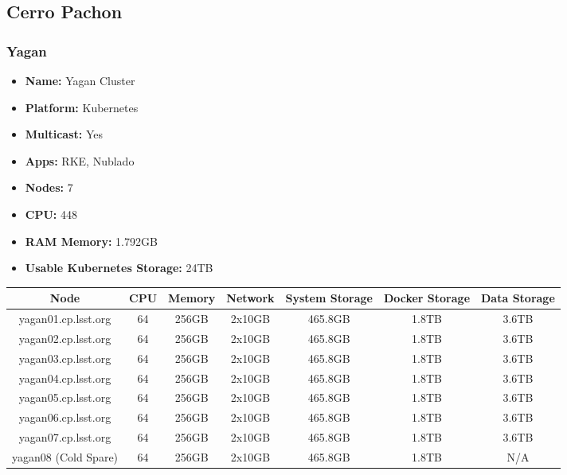 \newpage
\subsection{Cerro Pachon}
\subsubsection{Yagan}
\begin{itemize}
  \itemsep0em 
  \item \textbf{Name:}       Yagan Cluster
  \item \textbf{Platform:}   Kubernetes
  \item \textbf{Multicast:}  Yes
  \item \textbf{Apps:}       RKE, Nublado
  \item \textbf{Nodes:}      7
  \item \textbf{CPU:}        448
  \item \textbf{RAM Memory:} 1.792GB
  \item \textbf{Usable Kubernetes Storage:} 24TB
\end{itemize}
\begin{center}
  \small
  \begin{tabular}{||c c c c c c c||} 
    \hline
    \textbf{Node} & \textbf{CPU} & \textbf{Memory} & \textbf{Network} & \textbf{System Storage} & \textbf{Docker Storage} & \textbf{Data Storage} \\ [0.5ex]
    \hline
    yagan01.cp.lsst.org & 64 & 256GB & 2x10GB & 465.8GB & 1.8TB & 3.6TB \\
    \hline
    yagan02.cp.lsst.org & 64 & 256GB & 2x10GB & 465.8GB & 1.8TB & 3.6TB \\
    \hline
    yagan03.cp.lsst.org & 64 & 256GB & 2x10GB & 465.8GB & 1.8TB & 3.6TB \\
    \hline
    yagan04.cp.lsst.org & 64 & 256GB & 2x10GB & 465.8GB & 1.8TB & 3.6TB \\
    \hline
    yagan05.cp.lsst.org & 64 & 256GB & 2x10GB & 465.8GB & 1.8TB & 3.6TB \\
    \hline
    yagan06.cp.lsst.org & 64 & 256GB & 2x10GB & 465.8GB & 1.8TB & 3.6TB \\
    \hline
    yagan07.cp.lsst.org & 64 & 256GB & 2x10GB & 465.8GB & 1.8TB & 3.6TB \\
    \hline    
    yagan08 (Cold Spare) & 64 & 256GB & 2x10GB & 465.8GB & 1.8TB & N/A \\
    \hline    
  \end{tabular}
\end{center}

